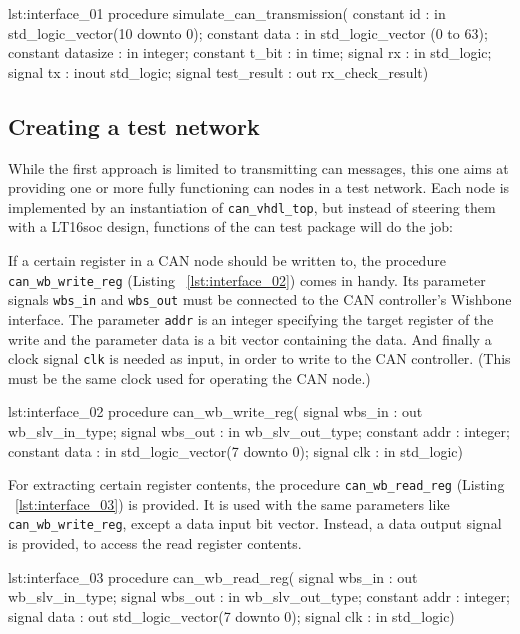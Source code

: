 \begin{vhdl}[Interface]{lst:interface_01}
procedure simulate_can_transmission(
        constant id 		: in std_logic_vector(10 downto 0);
        constant data		: in std_logic_vector (0 to 63);
        constant datasize	: in integer;
        constant t_bit		: in time;
        signal rx			: in std_logic;
        signal tx			: inout std_logic;
        signal test_result	: out rx_check_result)
\end{vhdl}

\subsection{Creating a test network}
While the first approach is limited to transmitting can messages, this one aims at providing one or more fully functioning can nodes in a test network. Each node is implemented by an instantiation of \verb=can_vhdl_top=, but instead of steering them with a LT16soc design, functions of the can test package will do the job:

If a certain register in a CAN node should be written to, the procedure \verb=can_wb_write_reg= (Listing ~\ref{lst:interface_02}) comes in handy. Its parameter signals \verb=wbs_in= and \verb=wbs_out= must be connected to the CAN controller's Wishbone interface. The parameter \verb=addr= is an integer specifying the target register of the write and the parameter data is a bit vector containing the data. And finally a clock signal \verb=clk= is needed as input, in order to write to the CAN controller. (This must be the same clock used for operating the CAN node.)

\begin{vhdl}[Interface]{lst:interface_02}
procedure can_wb_write_reg(
        signal wbs_in 	: out wb_slv_in_type;
        signal wbs_out 	: in wb_slv_out_type;
        constant addr 	: integer;
        constant data	: in std_logic_vector(7 downto 0);
		signal clk 		: in std_logic)
\end{vhdl}

For extracting certain register contents, the procedure \verb=can_wb_read_reg= (Listing ~\ref{lst:interface_03}) is provided. It is used with the same parameters like \verb=can_wb_write_reg=, except a data input bit vector. Instead, a data output signal is provided, to access the read register contents.

\begin{vhdl}[Interface]{lst:interface_03}
procedure can_wb_read_reg(
        signal wbs_in 	: out wb_slv_in_type;
        signal wbs_out 	: in wb_slv_out_type;
        constant addr 	: integer;
        signal data		: out std_logic_vector(7 downto 0);
        signal clk 		: in std_logic)
\end{vhdl}

